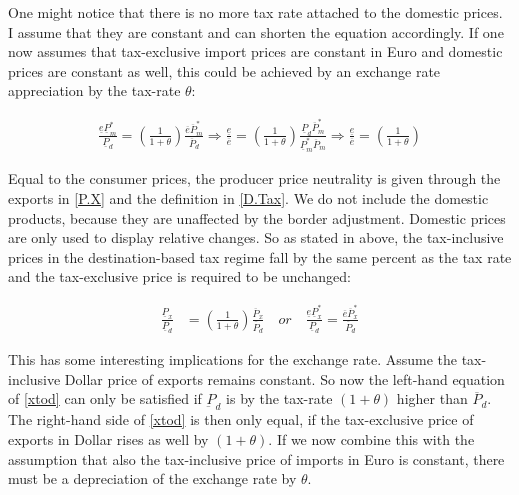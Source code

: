 One might notice that there is no more tax rate attached to the domestic prices. I assume that they are constant and can shorten the equation accordingly. If one now assumes that tax-exclusive import prices are constant in Euro and domestic prices are constant as well, this could be achieved by an exchange rate appreciation by the tax-rate $\theta$:

\begin{equation}
\begin{aligned}
\frac{\underline e \underline P_m^*}{\underline P_d} =\left( \frac{1}{1+\theta} \right) \frac{\overline e \overline P^*_m}{\overline P_d} \Rightarrow \frac{\underline e}{\overline e} = \left( \frac{1}{1+\theta} \right) \frac{\underline P_d\overline P^*_m}{\underline P_m^*\overline P_m} \Rightarrow \frac{\underline e}{\overline e} = \left( \frac{1}{1+\theta} \right) \nonumber
\end{aligned}
\end{equation}

Equal to the consumer prices, the producer price neutrality is given through the exports in \eqref{P.X} and the definition in \eqref{D.Tax}. We do not include the domestic products, because they are unaffected by the border adjustment. Domestic prices are only used to display relative changes. So as stated in above, the tax-inclusive prices in the destination-based tax regime fall by the same percent as the tax rate and the tax-exclusive price is required to be unchanged:

\begin{equation}\label{xtod}
\begin{aligned}
\frac{\underline P_x}{\underline P_d} &=  \left( \frac{1}{1+\theta} \right) \frac{\overline P_x}{\overline P_d} \quad or \quad \frac{\underline e \underline P_x^*}{\underline P_d} = \frac{\overline e \overline P^*_x}{\overline P_d} 
\end{aligned}
\end{equation}

This has some interesting implications for the exchange rate. Assume the tax-inclusive Dollar price of exports remains constant. So now the left-hand equation of \eqref{xtod} can only be satisfied if $\underbar P_d$ is by the tax-rate $(1+\theta)$ higher than $\overbar P_d$. The right-hand side of \eqref{xtod} is then only equal, if the tax-exclusive price of exports in Dollar rises as well by $(1+\theta)$. If we now combine this with the assumption that also the tax-inclusive price of imports in Euro is constant, there must be a depreciation of the exchange rate by $\theta$.

